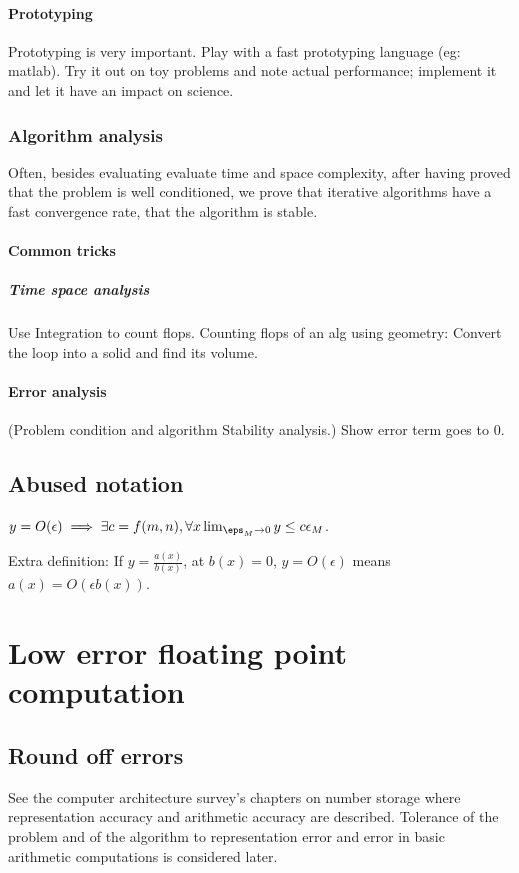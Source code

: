 \documentclass[oneside, article]{memoir}
\begin{document}
\subsection{Prototyping}
Prototyping is very important. Play with a fast prototyping language (eg: matlab). Try it out on toy problems and note actual performance; implement it and let it have an impact on science.

\section{Algorithm analysis}
Often, besides evaluating evaluate time and space complexity, after having proved that the problem is well conditioned, we prove that iterative algorithms have a fast convergence rate, that the algorithm is stable.

\subsection{Common tricks}
\subsubsection{Time space analysis}
Use Integration to count flops. Counting flops of an alg using geometry: Convert the loop into a solid and find its volume.

\subsection{Error analysis}
(Problem condition and algorithm Stability analysis.) Show error term goes to 0.

\chapter{Abused notation}
$y = O(\epsilon) \implies  \exists c = f(m,n), \forall x \lim_{\eps_{M} \to 0} y \leq c\epsilon_{M}$.

Extra definition: If $y = \frac{a(x)}{b(x)}$, at $b(x) = 0$, $y = O(\epsilon)$ means $a(x) = O(\epsilon b(x))$.

\part{Low error floating point computation}
\chapter{Round off errors}
See the computer architecture survey's chapters on number storage where representation accuracy and arithmetic accuracy are described. Tolerance of the problem and of the algorithm to representation error and error in basic arithmetic computations is considered later.
\end{document}
